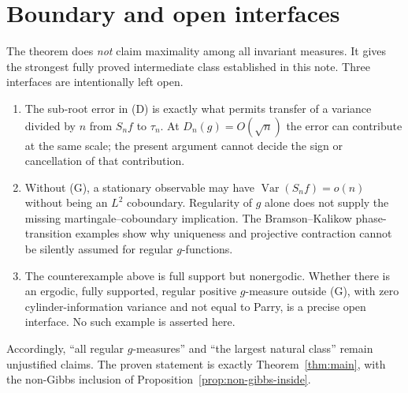 \documentclass[11pt]{article}
\theoremstyle{definition}
\theoremstyle{remark}
\newcommand{\Var}{\operatorname{Var}}
\begin{document}
\section{Boundary and open interfaces}

The theorem does \emph{not} claim maximality among all invariant measures.
It gives the strongest fully proved intermediate class established in this
note.  Three interfaces are intentionally left open.

\begin{enumerate}
\item The sub-root error in (D) is exactly what permits transfer of a
variance divided by $n$ from $S_nf$ to $\tau_n$.  At
$D_n(g)=O(\sqrt n)$ the error can contribute at the same scale; the present
argument cannot decide the sign or cancellation of that contribution.
\item Without (G), a stationary observable may have
$\Var(S_nf)=o(n)$ without being an $L^2$ coboundary.  Regularity of $g$
alone does not supply the missing martingale--coboundary implication.
The Bramson--Kalikow phase-transition examples
\cite{BK1993,GalloEtAl2013} show why uniqueness and projective contraction
cannot be silently assumed for regular $g$-functions.
\item The counterexample above is full support but nonergodic.  Whether
there is an ergodic, fully supported, regular positive $g$-measure outside
(G), with zero cylinder-information variance and not equal to Parry, is a
precise open interface.  No such example is asserted here.
\end{enumerate}

Accordingly, ``all regular $g$-measures'' and ``the largest natural class''
remain unjustified claims.  The proven statement is exactly
Theorem~\ref{thm:main}, with the non-Gibbs inclusion of
Proposition~\ref{prop:non-gibbs-inside}.
\end{document}
